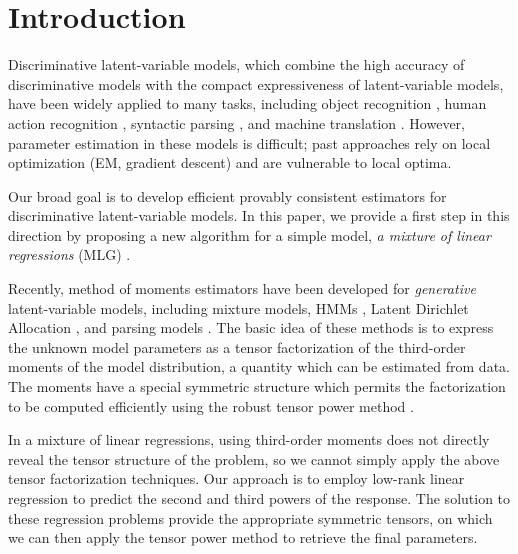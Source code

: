 \section{Introduction}
\label{sec:intro}

Discriminative latent-variable models,
which combine the high accuracy of discriminative models
with the compact expressiveness of latent-variable models,
have been widely applied to many tasks, including
object recognition \cite{quattoni04crf},
human action recognition \cite{wang09crf},
syntactic parsing \cite{petrov08discriminative},
and machine translation \cite{liang06discrimative}.
However, parameter estimation in these models is difficult;
past approaches rely on local optimization (EM, 
gradient descent) and are vulnerable to local optima.

Our broad goal is to develop efficient provably consistent estimators for
discriminative latent-variable models.
In this paper, we provide a first step in this 
direction by proposing a new algorithm for a simple model,
\emph{a mixture of linear regressions} (MLG) \cite{VieleTong2002}.

Recently, method of moments estimators have been developed for
\emph{generative} latent-variable models, including
mixture models, HMMs \cite{anandkumar12moments},
Latent Dirichlet Allocation \cite{anandkumar12lda},
and parsing models \cite{hsu12identifiability}.
The basic idea of these methods is to express
the unknown model parameters as a tensor factorization
of the third-order moments of the model distribution, a quantity
which can be estimated from data.
The moments have a special symmetric structure
which permits the factorization to be computed efficiently using the robust
tensor power method \cite{AnandkumarGeHsu2012}.

In a mixture of linear regressions, using third-order moments does not
directly reveal the tensor structure of the problem, so we cannot
simply apply the above tensor factorization techniques.  Our approach
is to employ low-rank linear regression
\cite{NegahbanWainwright2009,Tomioka2011} to predict the second and third powers of
the response.  The solution to these regression problems provide the appropriate symmetric tensors,
on which we can then apply the tensor power method to retrieve the final parameters.

